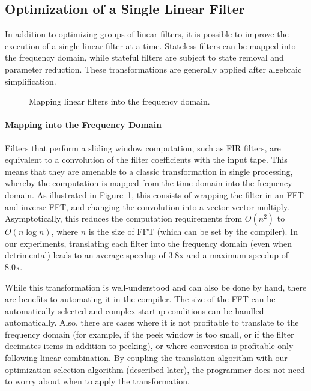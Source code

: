 \subsection*{Optimization of a Single Linear Filter}

In addition to optimizing groups of linear filters, it is possible to
improve the execution of a single linear filter at a time.  Stateless
filters can be mapped into the frequency domain, while stateful
filters are subject to state removal and parameter reduction.  These
transformations are generally applied after algebraic simplification.

\begin{figure}[t]
\centering
{}
\caption{Mapping linear filters into the frequency domain.\protect\label{fig:freq}}
\end{figure}

\paragraph*{Mapping into the Frequency Domain}  Filters that perform a 
sliding window computation, such as FIR filters, are equivalent to a
convolution of the filter coefficients with the input tape.  This
means that they are amenable to a classic transformation in single
processing, whereby the computation is mapped from the time domain
into the frequency domain.  As illustrated in Figure~\ref{fig:freq},
this consists of wrapping the filter in an FFT and inverse FFT, and
changing the convolution into a vector-vector multiply.
Asymptotically, this reduces the computation requirements from
$O(n^2)$ to $O(n \log n)$, where $n$ is the size of FFT (which can be
set by the compiler).  In our experiments, translating each filter
into the frequency domain (even when detrimental) leads to an average
speedup of 3.8x and a maximum speedup of 8.0x.

While this transformation is well-understood and can also be done by
hand, there are benefits to automating it in the compiler.  The size
of the FFT can be automatically selected and complex startup
conditions can be handled automatically.  Also, there are cases where
it is not profitable to translate to the frequency domain (for
example, if the peek window is too small, or if the filter decimates
items in addition to peeking), or where conversion is profitable only
following linear combination.  By coupling the translation algorithm
with our optimization selection algorithm (described later), the
programmer does not need to worry about when to apply the
transformation.


